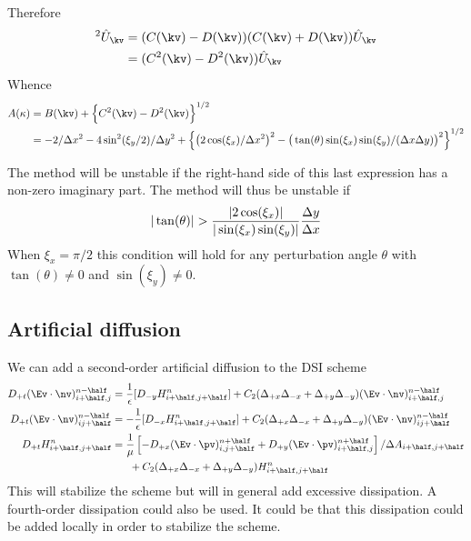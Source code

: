 \documentclass[10pt]{article}
\begin{document}
Therefore
\begin{align*}
  [ A(\kappa) - B(\kv) ]^2 \Uh_\kv &= ( C(\kv) - D(\kv) )(  C(\kv) + D(\kv) )\Uh_\kv \\ 
                                   &= ( C^2(\kv) - D^2(\kv) )\Uh_\kv \\
\end{align*}
Whence
\begin{align*}
  A(\kappa) & = B(\kv) + \Big\{ C^2(\kv) - D^2(\kv) \Big\}^{1/2} \\
            &= -2/\dx^2 - 4 \sin^2(\xi_y/2)/\dy^2 
                 + \Big\{ \big(2\cos(\xi_x)/\dx^2 \big)^2 - \big(\tan(\theta) \sin(\xi_x)\sin(\xi_y)/(\dx\dy)\big)^2 \Big\}^{1/2}
\end{align*}

The method will be unstable if the right-hand side of this last expression has a non-zero imaginary part.
The method will thus be unstable if
\begin{align*}
  |\tan(\theta)| > { | 2\cos(\xi_x) | \over |\sin(\xi_x)\sin(\xi_y)| } {\Delta y \over \Delta x}
\end{align*}
When $\xi_x=\pi/2$ this condition will hold for any perturbation angle $\theta$ with 
$\tan(\theta)\ne 0$ and $\sin(\xi_y)\ne0$.




\subsection{Artificial diffusion}

We can add a second-order artificial diffusion to the DSI scheme
\begin{align*}
  D_{+t} (\En)_{i\ph,j}^{n\mh} &=  {1\over\eps}[ D_{-y} H_{i\ph,j\ph}^n ] 
                                  + C_2 (\Delta_{+x}\Delta_{-x}+\Delta_{+y}\Delta_{-y})(\En)_{i\ph,j}^{n\mh} \\
  D_{+t} (\En)_{ij\ph}^{n\mh}  &= -{1\over\eps}[ D_{-x} H_{i\ph,j\ph}^n ]  
                                  + C_2 (\Delta_{+x}\Delta_{-x}+\Delta_{+y}\Delta_{-y})(\En)_{ij\ph}^{n\mh} \\
  D_{+t} H_{i\ph,j\ph}^{n} &=  {1\over\mu}\left[ - D_{+x} (\Ep)_{i,j\ph}^{n\ph}
               + D_{+y} (\Ep)_{i\ph,j}^{n\ph} \right] /\Delta A_{i\ph,j\ph} \\
          &~~~~~     + C_2 (\Delta_{+x}\Delta_{-x}+\Delta_{+y}\Delta_{-y})H_{i\ph,j\ph}^{n}
\end{align*}
This will stabilize the scheme but will in general add excessive dissipation.
A fourth-order dissipation could also be used. It could be that this dissipation could be added
locally in order to stabilize the scheme.
\end{document}
